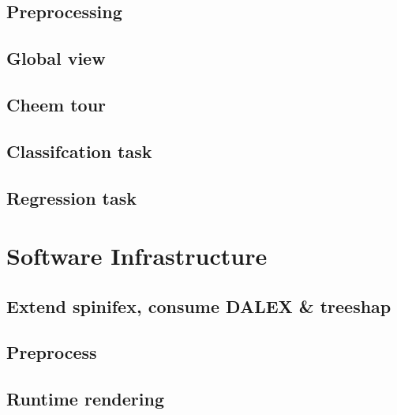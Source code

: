 \documentclass[
]{article}
\begin{document}
\hypertarget{preprocessing}{%
\subsection{Preprocessing}\label{preprocessing}}

\hypertarget{global-view}{%
\subsection{Global view}\label{global-view}}

\hypertarget{cheem-tour}{%
\subsection{Cheem tour}\label{cheem-tour}}

\hypertarget{classifcation-task}{%
\subsection{Classifcation task}\label{classifcation-task}}

\hypertarget{regression-task}{%
\subsection{Regression task}\label{regression-task}}

\hypertarget{sec:softwareinfrastructure}{%
\section{Software Infrastructure}\label{sec:softwareinfrastructure}}

\hypertarget{extend-spinifex-consume-dalex-treeshap}{%
\subsection{Extend spinifex, consume DALEX \& treeshap}\label{extend-spinifex-consume-dalex-treeshap}}

\hypertarget{preprocess}{%
\subsection{Preprocess}\label{preprocess}}

\hypertarget{runtime-rendering}{%
\subsection{Runtime rendering}\label{runtime-rendering}}
\end{document}
